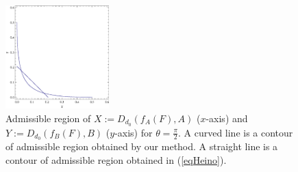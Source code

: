 \documentclass[12pt,showpacs,preprintnumbers,amsmath,amssymb]{revtex4-2}
\begin{document}
\begin{figure}[thbp]
\begin{center}
 \includegraphics[width=40mm]{uncertain-1}
\end{center}
 \caption{ \label{fig:one}
 Admissible region of $X:=D_{d_0}(f_A(F),A)$ ($x$-axis) and 
 $Y:=D_{d_0}(f_B(F),B)$ ($y$-axis) for $\theta=\frac{\pi}{2}$. 
 A curved line is a contour of admissible region 
 obtained by our method. A straight line is a contour of 
 admissible region obtained in (\ref{eqHeino}).
 }
\end{figure}
\end{document}
